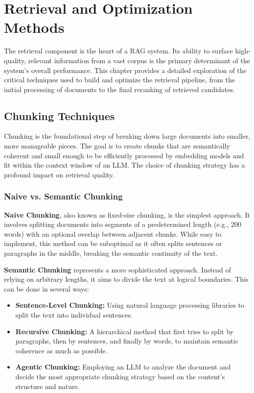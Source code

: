 \chapter{Retrieval and Optimization Methods}
\label{chap:retrieval_optimization}

The retrieval component is the heart of a RAG system. Its ability to surface high-quality, relevant information from a vast corpus is the primary determinant of the system's overall performance. This chapter provides a detailed exploration of the critical techniques used to build and optimize the retrieval pipeline, from the initial processing of documents to the final reranking of retrieved candidates.

\section{Chunking Techniques}
Chunking is the foundational step of breaking down large documents into smaller, more manageable pieces. The goal is to create chunks that are semantically coherent and small enough to be efficiently processed by embedding models and fit within the context window of an LLM. The choice of chunking strategy has a profound impact on retrieval quality.

\subsection{Naive vs. Semantic Chunking}
\textbf{Naive Chunking}, also known as fixed-size chunking, is the simplest approach. It involves splitting documents into segments of a predetermined length (e.g., 200 words) with an optional overlap between adjacent chunks. While easy to implement, this method can be suboptimal as it often splits sentences or paragraphs in the middle, breaking the semantic continuity of the text.

\textbf{Semantic Chunking} represents a more sophisticated approach. Instead of relying on arbitrary lengths, it aims to divide the text at logical boundaries. This can be done in several ways:
\begin{itemize}
    \item \textbf{Sentence-Level Chunking:} Using natural language processing libraries to split the text into individual sentences.
    \item \textbf{Recursive Chunking:} A hierarchical method that first tries to split by paragraphs, then by sentences, and finally by words, to maintain semantic coherence as much as possible.
    \item \textbf{Agentic Chunking:} Employing an LLM to analyze the document and decide the most appropriate chunking strategy based on the content's structure and nature.
\end{itemize}

